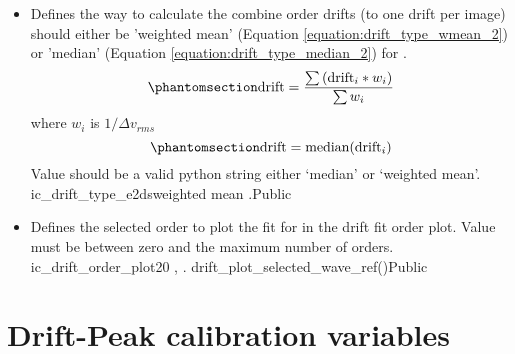 \begin{itemize}
\item {}
{Defines the way to calculate the combine order drifts (to one drift per image) should either be 'weighted mean' (Equation \ref{equation:drift_type_wmean_2}) or 'median' (Equation \ref{equation:drift_type_median_2}) for \calDRIFTE.
\begin{equation}
\namedlabel{equation:drift_type_wmean_2}
\text{drift} = \frac{\sum{(\text{drift}_i * w_i)}}{\sum{w_i}}
\end{equation}
\noindent where $w_i$ is $1/\Delta v_{rms}$
\begin{equation}
\namedlabel{equation:drift_type_median_2}
\text{drift} = \text{median}(\text{drift}_i)
\end{equation}
\noindent Value should be a valid python string either `median' or `weighted mean'.
}
{ic\_drift\_type\_e2ds}{weighted mean}
{\calDRIFTE}{\constantsfile}{\calDRIFTE.\progMAIN}{Public}

\item {}
{Defines the selected order to plot the fit for in the drift fit order plot. Value must be between zero and the maximum number of orders.}
{ic\_drift\_order\_plot}{20}
{\calDRIFTRAW, \calDRIFTE}{\constantsfile}{\spirouPlot. drift\_plot\_selected\_wave\_ref()}{Public}

\end{itemize}

\clearpage
\newpage
\section{Drift-Peak calibration variables}
\label{ch:variables:driftpeak}

